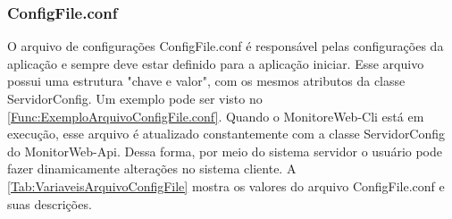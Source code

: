 \subsubsection{ConfigFile.conf}\label{subsec:ConfiguracesMonitorWeb-CliConfigFile}

O arquivo de configurações ConfigFile.conf é responsável pelas configurações da aplicação e sempre deve estar definido para a aplicação iniciar. Esse arquivo possui uma estrutura "chave e valor", com os mesmos atributos da classe ServidorConfig. Um exemplo pode ser visto no \autoref{Func:ExemploArquivoConfigFile.conf}. Quando o MonitoreWeb-Cli está em execução, esse arquivo é atualizado constantemente com a classe ServidorConfig do MonitorWeb-Api. Dessa forma, por meio do sistema servidor o usuário pode fazer dinamicamente alterações no sistema cliente. A \autoref{Tab:VariaveisArquivoConfigFile} mostra os valores do arquivo ConfigFile.conf e suas descrições.



